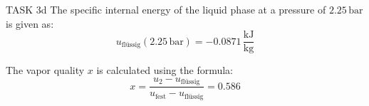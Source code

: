 TASK 3d  
The specific internal energy of the liquid phase at a pressure of \( 2.25 \, \text{bar} \) is given as:  
\[
u_{\text{flüssig}}(2.25 \, \text{bar}) = -0.0871 \, \frac{\text{kJ}}{\text{kg}}
\]

The vapor quality \( x \) is calculated using the formula:  
\[
x = \frac{u_2 - u_{\text{flüssig}}}{u_{\text{fest}} - u_{\text{flüssig}}} = 0.586
\]
